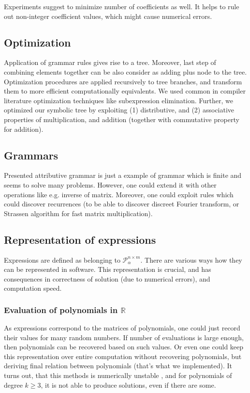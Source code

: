 \documentclass{article}
\begin{document}
Experiments suggest to minimize number of coefficients as well. It helps to rule out
non-integer coefficient values, which might cause numerical errors. 


\subsection{Optimization}

Application of grammar rules gives rise to a tree. Moreover, last step of
combining elements together can be also consider as adding plus node to the
tree. Optimization procedures are applied recursively to tree branches, and
transform them to more efficient computationally equivalents. We used common in
compiler literature optimization techniques like subexpression elimination.
Further, we optimized our symbolic tree by exploiting (1) distributive, and (2)
associative properties of multiplication, and addition (together with
commutative property for addition).

\subsection{Grammars}
Presented attributive grammar is just a example of grammar which is finite
and seems to solve many problems. However, one could extend it with 
other operations like e.g. inverse of matrix. Moreover, one could exploit
rules which could discover recurrences (to be able to discover discreet Fourier transform, or
Strassen algorithm for fast matrix multiplication).

\subsection{Representation of expressions}

Expressions are defined as belonging to $\mathcal{P}^{n \times m}_\alpha$. There are various
ways how they can be represented in software. This representation is crucial, and has consequences in
 correctness of solution (due to numerical errors), and computation speed.

\subsubsection{Evaluation of polynomials in $\mathbb{R}$}
As expressions correspond to the matrices of polynomials, one could just record their values
for many random numbers. If number of evaluations is large enough, then polynomials can be
recovered based on such values. Or even one could keep this representation over entire 
computation without recovering polynomials, but deriving final relation between polynomials (that's what we implemented).
It turns out, that this methods is numerically unstable
, and for polynomials of degree $k \geq 3$, it is not able to produce solutions, even if there are some.
\end{document}
